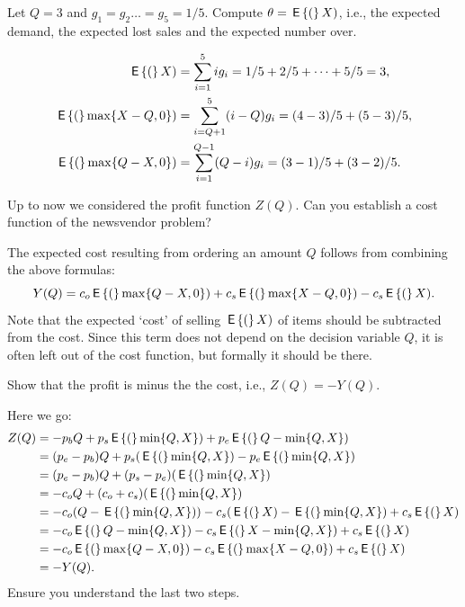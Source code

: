 \begin{question}
  Let $Q=3$ and $g_1=g_2\ldots=g_5 = 1/5$. Compute $\theta = \,\mathsf{E}\left\{(\right\}X)$, i.e., the expected demand, the expected lost sales and the expected number over.
  \begin{solution}
    \begin{align*}
      \,\mathsf{E}\left\{(\right\} X) &= \sum_{i=1}^5 i g_i = 1/5+2/5+\cdots+5/5 = 3, \\
      \,\mathsf{E}\left\{(\right\}\max\{X-Q,0\}) &= \sum_{i=Q+1}^5 (i-Q) g_i = (4-3)/5 + (5-3)/5,\\
      \,\mathsf{E}\left\{(\right\}\max\{Q-X,0\}) &= \sum_{i=1}^{Q-1} (Q-i) g_i = (3-1)/5 + (3-2)/5.
    \end{align*}
  \end{solution}
\end{question}

\begin{question}
  Up to now we considered the profit function $Z(Q)$.  Can you
  establish a cost function of the newsvendor problem?
  \begin{solution}
The expected cost resulting from ordering an amount $Q$ follows
from combining the above formulas:
\begin{equation*}
     Y(Q) = c_o  \,\mathsf{E}\left\{(\right\} \max\{Q-X, 0\})  +   c_s \,\mathsf{E}\left\{(\right\} \max\{X-Q, 0\}) - c_s\,\mathsf{E}\left\{(\right\}X).
\end{equation*}
Note that the expected `cost' of selling $\,\mathsf{E}\left\{(\right\}X)$ of items should be subtracted from the cost. Since this term does not depend on the decision variable $Q$, it is often left out of the cost function, but formally it should be there.
  \end{solution}
\end{question}


\begin{question}
  Show that the profit is minus the the cost, i.e., $Z(Q) = -Y(Q)$.
  \begin{solution}
    Here we go:
    \begin{equation*}
      \begin{split}
        Z(Q) 
&=  -p_bQ+p_s\,\mathsf{E}\left\{(\right\}\min\{Q,X\}) + p_e\,\mathsf{E}\left\{(\right\}Q-\min\{Q,X\}) \\
&=  (p_e - p_b)Q+ p_s(\,\mathsf{E}\left\{(\right\}\min\{Q,X\}) - p_e\,\mathsf{E}\left\{(\right\}\min\{Q,X\}) \\
&=  (p_e - p_b)Q+ (p_s-p_e)(\,\mathsf{E}\left\{(\right\}\min\{Q,X\})\\
&=  -c_oQ+ (c_o+c_s)(\,\mathsf{E}\left\{(\right\}\min\{Q,X\})\\
&=  -c_o( Q - \,\mathsf{E}\left\{(\right\}\min\{Q,X\})) - c_s(\,\mathsf{E}\left\{(\right\}X) - \,\mathsf{E}\left\{(\right\}\min\{Q,X\}) + c_s\,\mathsf{E}\left\{(\right\}X)\\
&=  -c_o \,\mathsf{E}\left\{(\right\}Q-\min\{Q,X\}) - c_s\,\mathsf{E}\left\{(\right\}X-\min\{Q,X\}) + c_s\,\mathsf{E}\left\{(\right\}X)\\
&=  -c_o \,\mathsf{E}\left\{(\right\}\max\{Q-X,0\}) - c_s\,\mathsf{E}\left\{(\right\}\max\{X-Q,0\}) + c_s\,\mathsf{E}\left\{(\right\}X)\\
&=  -Y(Q).
      \end{split}
    \end{equation*}
Ensure you understand the last two steps. 
  \end{solution}
\end{question}

